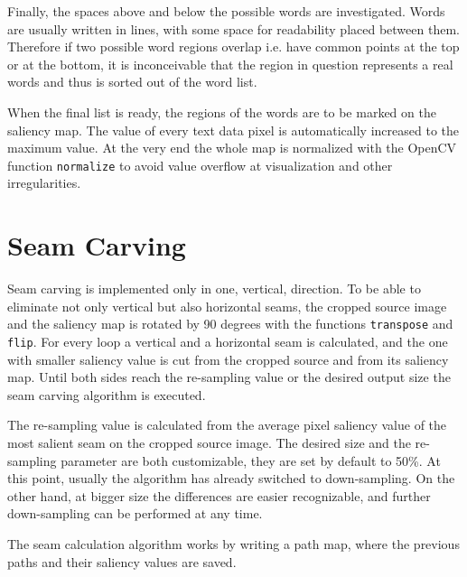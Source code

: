 \documentclass[draft,final]{vutinfth} %
\begin{document}
	Finally, the spaces above and below the possible words are investigated.
	Words are usually written in lines, with some space for readability placed between them. 
	Therefore if two possible word regions overlap i.e. have  common points at the top or at the bottom, it is inconceivable that the region in question represents a real words and thus is sorted out of the word list.\par 
	When the final list is ready, the regions of the words are to be marked on the saliency map.
	The value of every text data pixel is automatically increased to the maximum value.
	At the very end the whole map is normalized with the OpenCV function \texttt{normalize} to avoid value overflow at visualization and other irregularities.  
	
	\section{Seam Carving}
	Seam carving is implemented only in one, vertical, direction. 
	To be able to eliminate not only vertical but also horizontal seams, the cropped source image and the saliency map is rotated by 90 degrees with the functions \texttt{transpose} and \texttt{flip}.
	For every loop a vertical and a horizontal seam is calculated, and the one with smaller saliency value is cut from the cropped source and from its saliency map.
	Until both sides reach the re-sampling value or the desired output size the seam carving algorithm is executed.\par 
	The re-sampling value is calculated from the average pixel saliency value of the most salient seam on the cropped source image.
	The desired size and the re-sampling parameter are both customizable, they are set by default to 50\%.
	At this point, usually the algorithm has already switched to down-sampling.
	On the other hand, at bigger size the differences are easier recognizable, and further down-sampling can be performed at any time.\par   
	The seam calculation algorithm works by writing a path map, where the previous paths and their saliency values are saved.
\end{document}
